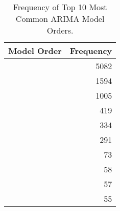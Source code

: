 \begin{table}
\caption{Frequency of Top 10 Most Common ARIMA Model Orders.}
\label{tab:arima_orders}
\begin{tabular}{lr}
\toprule
Model Order & Frequency \\
\midrule
[0 0 0] & 5082 \\
[0 0 1] & 1594 \\
[1 0 0] & 1005 \\
[0 0 2] & 419 \\
[1 0 1] & 334 \\
[2 0 0] & 291 \\
[0 0 3] & 73 \\
[2 0 1] & 58 \\
[3 0 0] & 57 \\
[1 0 2] & 55 \\
\bottomrule
\end{tabular}
\end{table}
